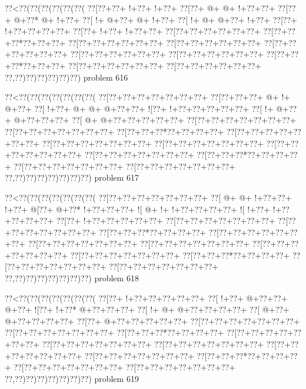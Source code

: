 \vbox{\vbox{\goo
\0??<\0??(\0??(\0??(\0??(\0??(\0??(
\0??[\0??+\0??+\- !+\0??+\- !+\0??+
\0??[\0??+\- @+\- @+\- !+\0??+\0??+
\0??[\0??+\- @+\0??*\- @+\- !+\0??+
\0??[\- !+\- @+\0??+\- @+\- !+\0??+
\0??[\- !+\- @+\- @+\0??+\- !+\0??+
\0??[\0??+\- !+\0??+\0??+\0??+\0??+
\0??[\0??+\- !+\0??+\- !+\0??+\0??+
\0??[\0??+\0??+\0??+\0??+\0??+\0??+
\0??[\0??+\0??+\0??*\0??+\0??+\0??+
\0??[\0??+\0??+\0??+\0??+\0??+\0??+
\0??[\0??+\0??+\0??+\0??+\0??+\0??+
\0??[\0??+\0??+\0??+\0??+\0??+\0??+
\0??[\0??+\0??+\0??+\0??+\0??+\0??+
\0??[\0??+\0??+\0??+\0??+\0??+\0??+
\0??[\0??+\0??+\0??*\0??+\0??+\0??+
\0??[\0??+\0??+\0??+\0??+\0??+\0??+
\0??[\0??+\0??+\0??+\0??+\0??+\0??+
\0??,\0??)\0??)\0??)\0??)\0??)\0??)
}
\hfil problem 616\hfil\break
}

\vbox{\vbox{\goo
\0??<\0??(\0??(\0??(\0??(\0??(\0??(\0??(
\0??[\0??+\0??+\0??+\0??+\0??+\0??+\0??+
\0??[\0??+\0??+\0??+\- @+\- !+\- @+\0??+
\0??[\- !+\0??+\- @+\- @+\- @+\0??+\0??+
\- ![\0??+\- !+\0??+\0??+\0??+\0??+\0??+
\0??[\- !+\- @+\0??+\- @+\0??+\0??+\0??+
\0??[\- @+\- @+\0??+\0??+\0??+\0??+\0??+
\0??[\0??+\0??+\0??+\0??+\0??+\0??+\0??+
\0??[\0??+\0??+\0??+\0??+\0??+\0??+\0??+
\0??[\0??+\0??+\0??*\0??+\0??+\0??+\0??+
\0??[\0??+\0??+\0??+\0??+\0??+\0??+\0??+
\0??[\0??+\0??+\0??+\0??+\0??+\0??+\0??+
\0??[\0??+\0??+\0??+\0??+\0??+\0??+\0??+
\0??[\0??+\0??+\0??+\0??+\0??+\0??+\0??+
\0??[\0??+\0??+\0??+\0??+\0??+\0??+\0??+
\0??[\0??+\0??+\0??*\0??+\0??+\0??+\0??+
\0??[\0??+\0??+\0??+\0??+\0??+\0??+\0??+
\0??[\0??+\0??+\0??+\0??+\0??+\0??+\0??+
\0??,\0??)\0??)\0??)\0??)\0??)\0??)\0??)
}
\hfil problem 617\hfil\break
}

\vbox{\vbox{\goo
\0??<\0??(\0??(\0??(\0??(\0??(\0??(\0??(
\0??[\0??+\0??+\0??+\0??+\0??+\0??+\0??+
\0??[\- @+\- @+\- !+\0??+\0??+\- !+\0??+
\- @[\0??+\- @+\0??*\- !+\0??+\0??+\0??+
\- ![\- @+\- !+\- !+\0??+\0??+\0??+\0??+
\- ![\- !+\0??+\- !+\0??+\0??+\0??+\0??+
\0??[\0??+\- !+\0??+\0??+\0??+\0??+\0??+
\0??[\0??+\0??+\0??+\0??+\0??+\0??+\0??+
\0??[\0??+\0??+\0??+\0??+\0??+\0??+\0??+
\0??[\0??+\0??+\0??*\0??+\0??+\0??+\0??+
\0??[\0??+\0??+\0??+\0??+\0??+\0??+\0??+
\0??[\0??+\0??+\0??+\0??+\0??+\0??+\0??+
\0??[\0??+\0??+\0??+\0??+\0??+\0??+\0??+
\0??[\0??+\0??+\0??+\0??+\0??+\0??+\0??+
\0??[\0??+\0??+\0??+\0??+\0??+\0??+\0??+
\0??[\0??+\0??+\0??*\0??+\0??+\0??+\0??+
\0??[\0??+\0??+\0??+\0??+\0??+\0??+\0??+
\0??[\0??+\0??+\0??+\0??+\0??+\0??+\0??+
\0??,\0??)\0??)\0??)\0??)\0??)\0??)\0??)
}
\hfil problem 618\hfil\break
}

\vbox{\vbox{\goo
\0??<\0??(\0??(\0??(\0??(\0??(\0??(\0??(
\0??[\0??+\- !+\0??+\0??+\0??+\0??+\0??+
\0??[\- !+\0??+\- @+\0??+\0??+\- @+\0??+
\- ![\0??+\- !+\0??*\- @+\0??+\0??+\0??+
\0??[\- !+\- @+\- @+\0??+\0??+\0??+\0??+
\0??[\- @+\0??+\- @+\0??+\0??+\0??+\0??+
\0??[\0??+\- @+\0??+\0??+\0??+\0??+\0??+
\0??[\0??+\0??+\0??+\0??+\0??+\0??+\0??+
\0??[\0??+\0??+\0??+\0??+\0??+\0??+\0??+
\0??[\0??+\0??+\0??*\0??+\0??+\0??+\0??+
\0??[\0??+\0??+\0??+\0??+\0??+\0??+\0??+
\0??[\0??+\0??+\0??+\0??+\0??+\0??+\0??+
\0??[\0??+\0??+\0??+\0??+\0??+\0??+\0??+
\0??[\0??+\0??+\0??+\0??+\0??+\0??+\0??+
\0??[\0??+\0??+\0??+\0??+\0??+\0??+\0??+
\0??[\0??+\0??+\0??*\0??+\0??+\0??+\0??+
\0??[\0??+\0??+\0??+\0??+\0??+\0??+\0??+
\0??[\0??+\0??+\0??+\0??+\0??+\0??+\0??+
\0??,\0??)\0??)\0??)\0??)\0??)\0??)\0??)
}
\hfil problem 619\hfil\break
}

